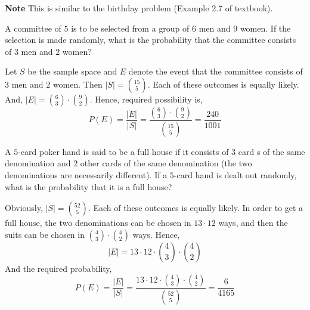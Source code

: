 \textbf{Note} This is similar to the birthday problem (Example 2.7 of
textbook).

\begin{example}
    A committee of $5$ is to be selected from a group of $6$ men and $9$ women.
If the selection is made randomly, what is the probability that the committee
consists of $3$ men and $2$ women?
\end{example}
\begin{solution}
    Let $S$ be the sample space and $E$ denote the event that the committee
consists of $3$ men and $2$ women. Then $\vert S \vert = {15 \choose 5}$. Each
of these outcomes is equally likely. And, $\vert E \vert = {6 \choose 3} \cdot
{9 \choose 2}$. Hence, required possibility is, 
\begin{equation*}
    P(E) = \frac{\vert E \vert}{\vert S \vert}
         = \frac{{6 \choose 3} \cdot {9 \choose 2}}{{15 \choose 5}}
         = \frac{240}{1001}
\end{equation*}
\end{solution}

\begin{example}
    A $5$-card poker hand is said to be a full house if it consists of $3$ card
s of the same denomination and $2$ other cards of the same denomination (the
two denominations are necessarily different). If a $5$-card hand is dealt out
randomly, what is the probability that it is a full house?
\end{example}
\begin{solution}
    Obviously, $\vert S \vert = {52 \choose 5}$. Each of these outcomes is
equally likely. In order to get a full house, the two denominations can be
chosen in $13 \cdot 12$ ways, and then the suits can be chosen in ${4 \choose
3} \cdot {4 \choose 2}$ ways. Hence,
\begin{equation*}
    \vert E \vert = 13 \cdot 12 \cdot {4 \choose 3} \cdot {4 \choose 2}
\end{equation*}
And the required probability, 
\begin{equation*}
    P(E) = \frac{\vert E \vert}{\vert S \vert}
         = \frac{13 \cdot 12 \cdot {4 \choose 3} \cdot {4 \choose 2}}{{52
           \choose 5}}
         = \frac{6}{4165}
\end{equation*}
\end{solution}

